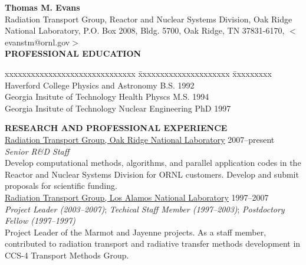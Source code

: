 \documentclass[11pt]{article}
\begin{document}

{\bf Thomas M. Evans}\\
Radiation Transport Group, Reactor and Nuclear Systems Division, Oak Ridge
National Laboratory, P.O. Box 2008, Bldg. 5700, Oak Ridge, TN 37831-6170,
$<$evanstm@ornl.gov$>$\\


{\bf PROFESSIONAL EDUCATION}
\begin{tabbing}
  xxxxxxxxxxxxxxxxxxxxxxxxxxxxxx \= xxxxxxxxxxxxxxxxxxxxx \= xxxxxxxxx \kill
  Haverford College              \> Physics and Astronomy \> B.S. 1992 \\
  Georgia Insitute of Technology \> Health Physcs         \> M.S. 1994 \\
  Georgia Insitute of Technology \> Nuclear Engineering   \> PhD  1997 
\end{tabbing}


{\bf RESEARCH AND PROFESSIONAL EXPERIENCE}\\

\underline{Radiation Transport Group, Oak Ridge National Laboratory}\hfill
2007--present\\
\textit{Senior R\&D Staff}\\
Develop computational methods, algorithms, and parallel application codes in
the Reactor and Nuclear Systems Division for ORNL customers.  Develop and
submit proposals for scientific funding.\\

\underline{Radiation Transport Group, Los Alamos National Laboratory}\hfill
1997--2007\\
\textit{Project Leader (2003--2007)}; \textit{Techical Staff Member
  (1997--2003)};
\textit{Postdoctory Fellow (1997--1997)}\\
Project Leader of the Marmot and Jayenne projects. As a staff member,
contributed to radiation transport and radiative
transfer methods development in CCS-4 Transport Methods Group. \\

\end{document}
